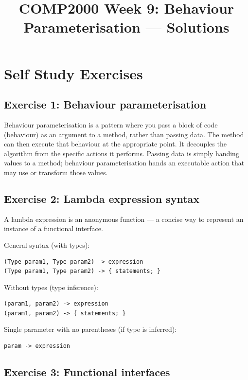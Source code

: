 \documentclass[twoside=false,DIV=14]{scrartcl}
\title{\color{redish} \vspace{-1em}COMP2000 Week 9: Behaviour Parameterisation --- Solutions}
\begin{document}
{\color{blackish}\maketitle}\vspace{-7em}

\section*{Self Study Exercises}

\subsection*{Exercise 1: Behaviour parameterisation}

Behaviour parameterisation is a pattern where you pass a block of code (behaviour) as an argument to a method, rather than passing data.  The method can then execute that behaviour at the appropriate point.  It decouples the algorithm from the specific actions it performs.  Passing data is simply handing values to a method; behaviour parameterisation hands an executable action that may use or transform those values.

\subsection*{Exercise 2: Lambda expression syntax}

A lambda expression is an anonymous function --- a concise way to represent an instance of a functional interface.

General syntax (with types):
\begin{verbatim}
(Type param1, Type param2) -> expression
(Type param1, Type param2) -> { statements; }
\end{verbatim}

Without types (type inference):
\begin{verbatim}
(param1, param2) -> expression
(param1, param2) -> { statements; }
\end{verbatim}

Single parameter with no parentheses (if type is inferred):
\begin{verbatim}
param -> expression
\end{verbatim}

\subsection*{Exercise 3: Functional interfaces}
\end{document}
